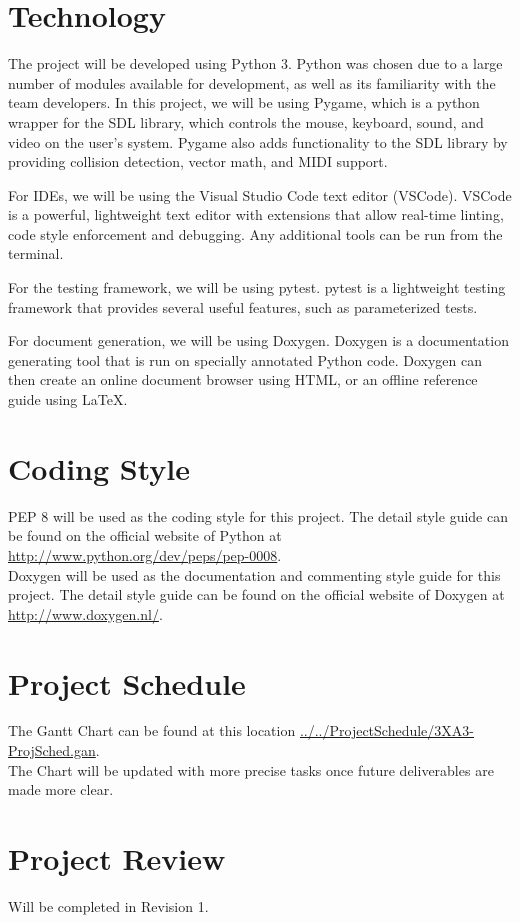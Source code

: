 \documentclass{article}
\begin{document}
\section{Technology}

The project will be developed using Python 3. Python was chosen due to a large number of modules available for development, as well as its familiarity with the team developers. In this project, we will be using Pygame, which is a python wrapper for the SDL library, which controls the mouse, keyboard, sound, and video on the user's system. Pygame also adds functionality to the SDL library by providing collision detection, vector math, and MIDI support. 

For IDEs, we will be using the Visual Studio Code text editor (VSCode). VSCode is a powerful, lightweight text editor with extensions that allow real-time linting, code style enforcement and debugging. Any additional tools can be run from the terminal. 

For the testing framework, we will be using pytest. pytest is a lightweight testing framework that provides several useful features, such as parameterized tests.

For document generation, we will be using Doxygen. Doxygen is a documentation generating tool that is run on specially annotated Python code. Doxygen can then create an online document browser using HTML, or an offline reference guide using \LaTeX.


\section{Coding Style}

PEP 8 will be used as the coding style for this project. The detail style guide can be found on the official website of Python at \url{http://www.python.org/dev/peps/pep-0008}.\\
Doxygen will be used as the documentation and commenting style guide for this project. The detail style guide can be found on the official website of Doxygen at \url{http://www.doxygen.nl/}.

\section{Project Schedule} \label{gantt}

The Gantt Chart can be found at this location \href{run:../../ProjectSchedule/3XA3-ProjSched.gan}{../../ProjectSchedule/3XA3-ProjSched.gan}. \\
The Chart will be updated with more precise tasks once future deliverables are made more clear.

\section{Project Review}
Will be completed in Revision 1.
\end{document}
